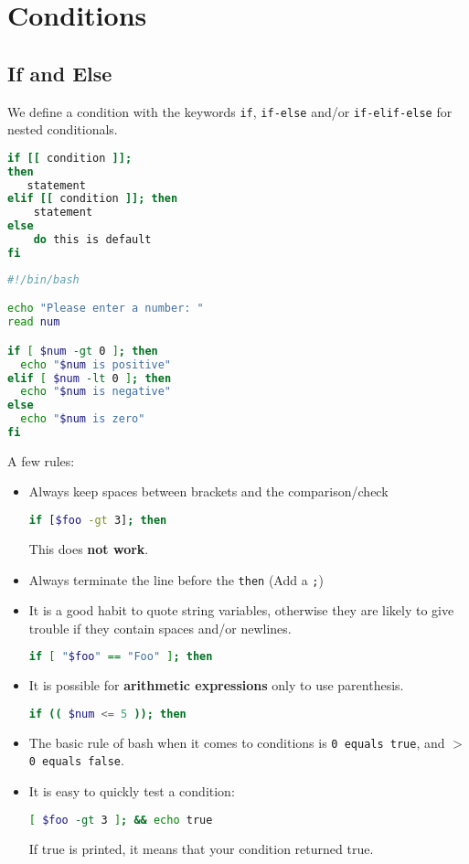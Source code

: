 \documentclass{article}
\newcommand{\inlinecode}[1]{\colorbox{backcolour}{\footnotesize{\texttt{#1}}}}
\begin{document}
\pagebreak
\section{Conditions}
\subsection{If and Else}
\begin{paracol}{2}
	\raggedright We define a condition with the keywords \inlinecode{if}, \inlinecode{if-else} and/or \inlinecode{if-elif-else} for nested conditionals.
	\begin{lstlisting}[style=command, language=bash]
if [[ condition ]];
then
   statement
elif [[ condition ]]; then
    statement
else
    do this is default
fi
\end{lstlisting}
	\begin{lstlisting}[style=command, language=bash]
#!/bin/bash

echo "Please enter a number: "
read num

if [ $num -gt 0 ]; then
  echo "$num is positive"
elif [ $num -lt 0 ]; then
  echo "$num is negative"
else
  echo "$num is zero"
fi
\end{lstlisting}
	A few rules:
	\begin{itemize}
		\item Always keep spaces between brackets and the comparison/check
		      \begin{lstlisting}[style=command, language=bash]
if [$foo -gt 3]; then
\end{lstlisting}
		      This does \textbf{not work}.
		\item Always terminate the line before the \inlinecode{then} (Add a \inlinecode{;})
		\item It is a good habit to quote string variables, otherwise they are likely to give trouble if they contain spaces and/or newlines.
		      \begin{lstlisting}[style=command, language=bash]
if [ "$foo" == "Foo" ]; then
\end{lstlisting}

		\item It is possible for \textbf{arithmetic expressions} only to use parenthesis.
		      \begin{lstlisting}[style=command, language=bash]
if (( $num <= 5 )); then
\end{lstlisting}
		\item The basic rule of bash when it comes to conditions is \inlinecode{0 equals true}, and \inlinecode{\(>\) 0 equals false}.
		\item It is easy to quickly test a condition:
		      \begin{lstlisting}[style=command, language=bash]
[ $foo -gt 3 ]; && echo true
\end{lstlisting}
		      If true is printed, it means that your condition returned true.
	\end{itemize}


\end{paracol}
\end{document}
